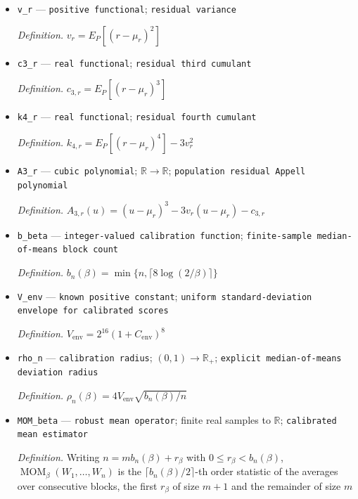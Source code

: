 \documentclass{article}
\begin{document}
\begin{itemize}
  \par\smallskip\noindent\emph{Definition.} \(\mu_r=E_P[r]\)
  \item \texttt{v\_\allowbreak{}r} --- \texttt{positive functional}; \texttt{residual variance}
  \par\smallskip\noindent\emph{Definition.} \(v_r=E_P[(r-\mu_r)^2]\)
  \item \texttt{c3\_\allowbreak{}r} --- \texttt{real functional}; \texttt{residual third cumulant}
  \par\smallskip\noindent\emph{Definition.} \(c_{3,r}=E_P[(r-\mu_r)^3]\)
  \item \texttt{k4\_\allowbreak{}r} --- \texttt{real functional}; \texttt{residual fourth cumulant}
  \par\smallskip\noindent\emph{Definition.} \(k_{4,r}=E_P[(r-\mu_r)^4]-3v_r^2\)
  \item \texttt{A3\_\allowbreak{}r} --- \texttt{cubic polynomial}; \(\mathbb R\to\mathbb R\); \texttt{population residual Appell polynomial}
  \par\smallskip\noindent\emph{Definition.} \(A_{3,r}(u)=(u-\mu_r)^3-3v_r(u-\mu_r)-c_{3,r}\)
  \item \texttt{b\_\allowbreak{}beta} --- \texttt{integer-\allowbreak{}valued calibration function}; \texttt{finite-\allowbreak{}sample median-\allowbreak{}of-\allowbreak{}means block count}
  \par\smallskip\noindent\emph{Definition.} \(b_n(\beta)=\min\{n,\lceil8\log(2/\beta)\rceil\}\)
  \item \texttt{V\_\allowbreak{}env} --- \texttt{known positive constant}; \texttt{uniform standard-\allowbreak{}deviation envelope for calibrated scores}
  \par\smallskip\noindent\emph{Definition.} \(V_{\mathrm{env}}=2^{16}(1+C_{\mathrm{env}})^8\)
  \item \texttt{rho\_\allowbreak{}n} --- \texttt{calibration radius}; \((0,1)\to\mathbb R_+\); \texttt{explicit median-\allowbreak{}of-\allowbreak{}means deviation radius}
  \par\smallskip\noindent\emph{Definition.} \(\rho_n(\beta)=4V_{\mathrm{env}}\sqrt{b_n(\beta)/n}\)
  \item \texttt{MOM\_\allowbreak{}beta} --- \texttt{robust mean operator}; finite real samples to \(\mathbb R\); \texttt{calibrated mean estimator}
  \par\smallskip\noindent\emph{Definition.} Writing \(n=m b_n(\beta)+r_\beta\) with \(0\le r_\beta<b_n(\beta)\), \(\operatorname{MOM}_{\beta}(W_1,\ldots,W_n)\) is the \(\lceil b_n(\beta)/2\rceil\)-th order statistic of the averages over consecutive blocks, the first \(r_\beta\) of size \(m+1\) and the remainder of size \(m\)

\end{itemize}
\end{document}
